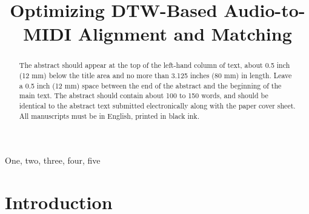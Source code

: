 \documentclass{article}
\title{Optimizing DTW-Based Audio-to-MIDI Alignment and Matching}
\begin{document}
\maketitle

\begin{abstract}
The abstract should appear at the top of the left-hand column of text, about
0.5 inch (12 mm) below the title area and no more than 3.125 inches (80 mm) in
length.  Leave a 0.5 inch (12 mm) space between the end of the abstract and the
beginning of the main text.  The abstract should contain about 100 to 150
words, and should be identical to the abstract text submitted electronically
along with the paper cover sheet.  All manuscripts must be in English, printed
in black ink.
\end{abstract}

\begin{keywords}
One, two, three, four, five
\end{keywords}

\section{Introduction}
\label{sec:intro}

\cite{hu2003polyphonic}



\end{document}
